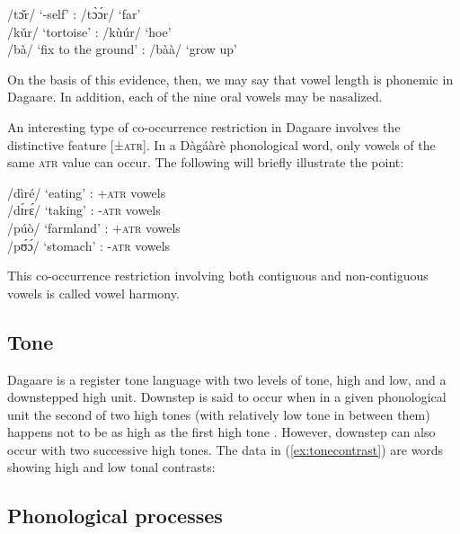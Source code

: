 \ea /tɔ̌r/ ‘-self’ : /tɔ̀ɔ́r/ ‘far’\\
/kǔr/ ‘tortoise’ : /kùúr/ ‘hoe’\\
/bà/ ‘fix to the ground’ : /bàà/ ‘grow up’
\z



On the basis of this evidence, then, we may say that vowel length is phonemic in Dagaare. In addition, each of the nine oral vowels may be nasalized. 

An interesting type of co-occurrence restriction in Dagaare involves the distinctive feature [±\textsc{atr}]. In a Dàgáàrè phonological word, only vowels of the same \textsc{atr} value can occur. The following will briefly illustrate the point:


\ea \label{ex:vowelharmony}/dìré/ ‘eating’ : +\textsc{atr} vowels\\
/dɪ́rɛ́/ ‘taking’ : -\textsc{atr} vowels\\
/púò/ ‘farmland’ : +\textsc{atr} vowels\\
/pʊ́ɔ́/ ‘stomach’ : -\textsc{atr} vowels\\
\z

This co-occurrence restriction involving both contiguous and non-contiguous vowels is called vowel harmony.

\subsection{Tone}
Dagaare is a register tone language with two levels of tone, high and low, and a
downstepped high unit. Downstep is said to occur when in a given phonological unit the
second of two high tones (with relatively low tone in between them) happens not to be as
 high as the first high tone \citep{Kennedy1966}. However, downstep can also occur with two successive high tones. The data in 
(\ref{ex:tonecontrast}) are words showing high and low tonal contrasts:

\subsection{Phonological processes}

